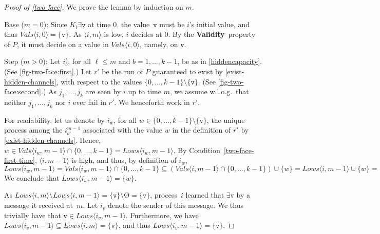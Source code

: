 \documentclass[11pt]{article}
\theoremstyle{definition}
\newcommand{\mv}{\mathtt{v}}
\newcommand{\existsv}{\exists{\mv}}
\newcommand{\knownvals}[1]{\ensuremath{\mathit{Vals}\node{#1}}}
\newcommand{\knownlows}[1]{\ensuremath{\mathit{Lows}\node{#1}}}
\newcommand{\set}[1]{\{#1\}}
\def\emptyset{\mbox{\O}}
\newcommand{\node}[1]{\langle#1\rangle}
\newcommand{\Validity}{{\bf Validity}}
\begin{document}
\begin{proof}[Proof of \cref{two-face}]
We prove the lemma by induction on $m$.

Base ($m=0$):
Since $K_i \existsv$ at time $0$, the value~$\mathtt{v}$ must be $i$'s initial value, and thus
$\knownvals{i,0}=\set{\mathtt{v}}$.
As $\node{i,m}$ is low, $i$ decides at $0$.
By the \Validity\ property of $P$, it must decide on a value in $\knownvals{i,0}$,
namely, on $\mathtt{v}$.

Step ($m>0$):
Let $i_b^{\ell}$,
for all $\ell\le m$ and $b=1,\ldots,k-1$,
be as in \cref{hiddencapacity}. (See \cref{fig-two-face:first}.)
Let $r'$ be the run of $P$ guaranteed to exist
by \cref{exist-hidden-channels},
with respect to the values $\set{0,\ldots,k-1} \setminus \set{\mathtt{v}}$. (See
\cref{fig-two-face:second}.)
As $j_1,\ldots,j_k$ are seen by $i$ up to time $m$,
we assume w.l.o.g.\ that neither $j_1,\ldots,j_k$ nor $i$ ever fail in $r'$.
We henceforth work in $r'$.

For readability, let us denote by $i_w$, for all
$w \in \set{0,\ldots,k-1} \setminus \set{\mathtt{v}}$, the unique process among
the $i_{b'}^{m-1}$ associated with the value $w$ in the definition of $r'$ by
\cref{exist-hidden-channels}.
Hence,
$w \in \knownvals{i_w,m-1} \cap \set{0,\ldots,k-1} = \knownlows{i_w,m-1}$.
By Condition~\ref{two-face-first-time}, $\node{i,m-1}$ is high,
and thus, by definition of $i_w$,
$\knownlows{i_w,m-1} = \knownvals{i_w,m-1} \cap \set{0,\ldots,k-1}
\subseteq
(\knownvals{i,m-1} \cap \set{0,\ldots,k-1}) \cup \set{w} =
\knownlows{i,m-1} \cup \set{w} = \set{w}.$
We conclude that $\knownlows{i_w,m-1} = \set{w}$.

As $\knownlows{i,m} \setminus \knownlows{i,m-1} = \set{\mathtt{v}} \setminus \emptyset =
\set{\mathtt{v}}$, process~$i$ learned that $\existsv$ by a message it received
at~$m$. Let $i_v$ denote the sender of this message.
We thus trivially have that $\mathtt{v} \in \knownlows{i_v,m-1}$.
Furthermore, we have $\knownlows{i_v,m-1} \subseteq \knownlows{i,m} = \set{\mathtt{v}}$,
and thus $\knownlows{i_v,m-1} = \set{\mathtt{v}}$.


\end{proof}
\end{document}
